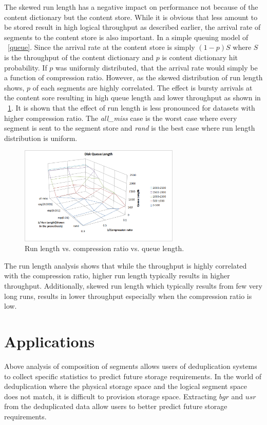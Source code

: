 The skewed run length has a negative impact on performance not because of the content dictionary but the content store. While it is obvious that less amount to be stored result in high logical throughput as described earlier, the arrival rate of segments to the content store is also important. In a simple queuing model of \figurename~\ref{queue}. Since the arrival rate at the content store is simply $(1-p)S$ where $S$ is the throughput of the content dictionary and $p$ is content dictionary hit probability. If $p$ was uniformly distributed, that the arrival rate would simply be a function of compression ratio. However, as the skewed distribution of run length shows, $p$ of each segments are highly correlated. The effect is bursty arrivals at the content sore resulting in high queue length and lower throughput as shown in \figurename~\ref{ql}. It is shown that the effect of run length is less pronounced for datasets with higher compression ratio. The \emph{all\_miss} case is the worst case where every segment is sent to the segment store and \emph{rand} is the best case where run length distribution is uniform.
 
\begin{figure}[!t]
\centering
\includegraphics[width=3in]{figure/dedup/disk_q}
\caption{Run length vs. compression ratio vs. queue length.}
\label{ql}
\end{figure}

The run length analysis shows that while the throughput is highly correlated with the compression ratio, higher run length typically results in higher throughput. Additionally, skewed run length which typically results from few very long runs, results in lower throughput especially when the compression ratio is low.

\section{Applications}\label{appp}
Above analysis of composition of segments allows users of deduplication systems to collect specific statistics to predict future storage requirements. In the world of deduplication where the physical storage space and the logical segment space does not match, it is difficult to provision storage space. Extracting $bgr$ and $usr$ from the deduplicated data allow users to better predict future storage requirements. 

